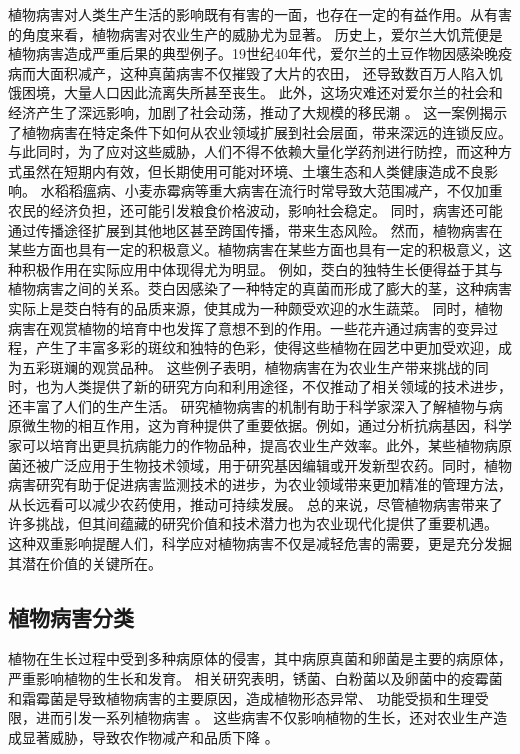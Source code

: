 \documentclass[AutoFakeBold]{LZUThesis-PgD&PhD}
\begin{document}
	植物病害对人类生产生活的影响既有有害的一面，也存在一定的有益作用。从有害的角度来看，植物病害对农业生产的威胁尤为显著。
	历史上，爱尔兰大饥荒便是植物病害造成严重后果的典型例子。19世纪40年代，爱尔兰的土豆作物因感染晚疫病而大面积减产，这种真菌病害不仅摧毁了大片的农田，
	还导致数百万人陷入饥饿困境，大量人口因此流离失所甚至丧生。
	此外，这场灾难还对爱尔兰的社会和经济产生了深远影响，加剧了社会动荡，推动了大规模的移民潮 \cite{ograda2009great}。
	这一案例揭示了植物病害在特定条件下如何从农业领域扩展到社会层面，带来深远的连锁反应。
	与此同时，为了应对这些威胁，人们不得不依赖大量化学药剂进行防控，而这种方式虽然在短期内有效，但长期使用可能对环境、土壤生态和人类健康造成不良影响。
	水稻稻瘟病、小麦赤霉病等重大病害在流行时常导致大范围减产，不仅加重农民的经济负担，还可能引发粮食价格波动，影响社会稳定。
	同时，病害还可能通过传播途径扩展到其他地区甚至跨国传播，带来生态风险。
	然而，植物病害在某些方面也具有一定的积极意义。植物病害在某些方面也具有一定的积极意义，这种积极作用在实际应用中体现得尤为明显。
	例如，茭白的独特生长便得益于其与植物病害之间的关系。茭白因感染了一种特定的真菌而形成了膨大的茎，这种病害实际上是茭白特有的品质来源，使其成为一种颇受欢迎的水生蔬菜。
	同时，植物病害在观赏植物的培育中也发挥了意想不到的作用。一些花卉通过病害的变异过程，产生了丰富多彩的斑纹和独特的色彩，使得这些植物在园艺中更加受欢迎，成为五彩斑斓的观赏品种。
	这些例子表明，植物病害在为农业生产带来挑战的同时，也为人类提供了新的研究方向和利用途径，不仅推动了相关领域的技术进步，还丰富了人们的生产生活。
	研究植物病害的机制有助于科学家深入了解植物与病原微生物的相互作用，这为育种提供了重要依据。例如，通过分析抗病基因，科学家可以培育出更具抗病能力的作物品种，提高农业生产效率。此外，某些植物病原菌还被广泛应用于生物技术领域，用于研究基因编辑或开发新型农药。同时，植物病害研究有助于促进病害监测技术的进步，为农业领域带来更加精准的管理方法，从长远看可以减少农药使用，推动可持续发展。
	总的来说，尽管植物病害带来了许多挑战，但其间蕴藏的研究价值和技术潜力也为农业现代化提供了重要机遇。
	这种双重影响提醒人们，科学应对植物病害不仅是减轻危害的需要，更是充分发掘其潜在价值的关键所在。
	
	
	
	\subsection{植物病害分类}
	
	植物在生长过程中受到多种病原体的侵害，其中病原真菌和卵菌是主要的病原体，严重影响植物的生长和发育。
	相关研究表明，锈菌、白粉菌以及卵菌中的疫霉菌和霜霉菌是导致植物病害的主要原因，造成植物形态异常、
	功能受损和生理受限，进而引发一系列植物病害 \cite{mendgen2002plant, glawe2008powdery, kamoun2015top, thines2016diversity}。
	这些病害不仅影响植物的生长，还对农业生产造成显著威胁，导致农作物减产和品质下降 \cite{gisi2002mechanisms, erwin1996phytophthora}。
	
\end{document}
